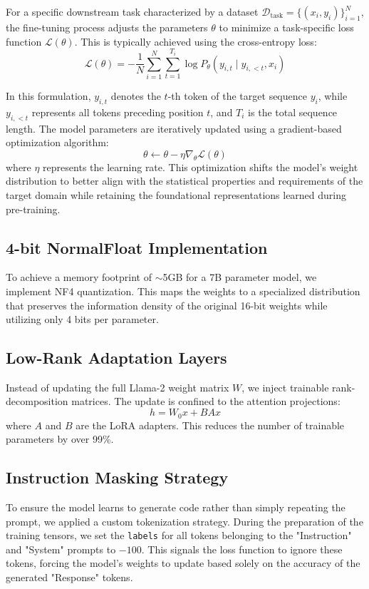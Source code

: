 For a specific downstream task characterized by a dataset $\mathcal{D}_{\text{task}} = \{(x_i, y_i)\}_{i=1}^N$, the fine-tuning process adjusts the parameters $\theta$ to minimize a task-specific loss function $\mathcal{L}(\theta)$. This is typically achieved using the cross-entropy loss:
\begin{equation}
\mathcal{L}(\theta) = - \frac{1}{N} \sum_{i=1}^{N} \sum_{t=1}^{T_i} \log P_\theta(y_{i,t} \mid y_{i,<t}, x_i)
\end{equation}

In this formulation, $y_{i,t}$ denotes the $t$-th token of the target sequence $y_i$, while $y_{i,<t}$ represents all tokens preceding position $t$, and $T_i$ is the total sequence length. The model parameters are iteratively updated using a gradient-based optimization algorithm:
\begin{equation}
\theta \leftarrow \theta - \eta \nabla_\theta \mathcal{L}(\theta)
\end{equation}
where $\eta$ represents the learning rate. This optimization shifts the model's weight distribution to better align with the statistical properties and requirements of the target domain while retaining the foundational representations learned during pre-training.

\subsection{4-bit NormalFloat Implementation}
To achieve a memory footprint of $\sim$5GB for a 7B parameter model, we implement NF4 quantization. This maps the weights to a specialized distribution that preserves the information density of the original 16-bit weights while utilizing only 4 bits per parameter.


\subsection{Low-Rank Adaptation Layers}
Instead of updating the full Llama-2 weight matrix $W$, we inject trainable rank-decomposition matrices. The update is confined to the attention projections:
\begin{equation}
h = W_0x + BAx
\end{equation}
where $A$ and $B$ are the LoRA adapters. This reduces the number of trainable parameters by over 99\%.


\subsection{Instruction Masking Strategy}
To ensure the model learns to generate code rather than simply repeating the prompt, we applied a custom tokenization strategy. During the preparation of the training tensors, we set the \texttt{labels} for all tokens belonging to the "Instruction" and "System" prompts to $-100$. This signals the loss function to ignore these tokens, forcing the model's weights to update based solely on the accuracy of the generated "Response" tokens.

